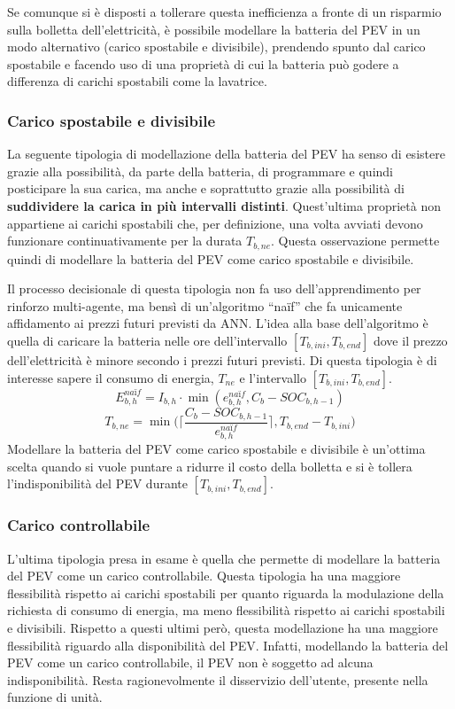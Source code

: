 \documentclass[italian, Lau, oneside]{sapthesis}
\begin{document}
Se comunque si è disposti a tollerare questa inefficienza a fronte di un risparmio sulla bolletta dell'elettricità, è possibile modellare la batteria del PEV in un modo alternativo (carico spostabile e divisibile), prendendo spunto dal carico spostabile e facendo uso di una proprietà di cui la batteria può godere a differenza di carichi spostabili come la lavatrice.

\subsubsection{Carico spostabile e divisibile}
La seguente tipologia di modellazione della batteria del PEV ha senso di esistere grazie alla possibilità, da parte della batteria, di programmare e quindi posticipare la sua carica, ma anche e soprattutto grazie alla possibilità di \textbf{suddividere la carica in più intervalli distinti}. Quest'ultima proprietà non appartiene ai carichi spostabili che, per definizione, una volta avviati devono funzionare continuativamente per la durata $T_{b,ne}$. Questa osservazione permette quindi di modellare la batteria del PEV come carico spostabile e divisibile.

Il processo decisionale di questa tipologia non fa uso dell'apprendimento per rinforzo multi-agente, ma bensì di un'algoritmo “naïf” che fa unicamente affidamento ai prezzi futuri previsti da ANN. L'idea alla base dell'algoritmo è quella di caricare la batteria nelle ore dell'intervallo $[T_{b,ini}, T_{b,end}]$ dove il prezzo dell'elettricità è minore secondo i prezzi futuri previsti. Di questa tipologia è di interesse sapere il consumo di energia, $T_{ne}$ e l'intervallo $[T_{b,ini}, T_{b,end}]$.
\begin{equation}
E^{naïf}_{b,h} = I_{b,h} \cdot \min(e^{naïf}_{b,h}, C_b - SOC_{b,h-1})
\end{equation}
\begin{equation}
    T_{b,ne} = \min \Bigg( \Bigg \lceil \frac{C_b - SOC_{b,h-1}}{e^{naïf}_{b,h}} \Bigg \rceil, T_{b,end}-T_{b,ini} \Bigg)
\end{equation}
Modellare la batteria del PEV come carico spostabile e divisibile è un'ottima scelta quando si vuole puntare a ridurre il costo della bolletta e si è tollera l'indisponibilità del PEV durante $[T_{b,ini}, T_{b,end}]$.

\subsubsection{Carico controllabile}
L'ultima tipologia presa in esame è quella che permette di modellare la batteria del PEV come un carico controllabile. Questa tipologia ha una maggiore flessibilità rispetto ai carichi spostabili per quanto riguarda la modulazione della richiesta di consumo di energia, ma meno flessibilità rispetto ai carichi spostabili e divisibili. Rispetto a questi ultimi però, questa modellazione ha una maggiore flessibilità riguardo alla disponibilità del PEV. Infatti, modellando la batteria del PEV come un carico controllabile, il PEV non è soggetto ad alcuna indisponibilità. Resta ragionevolmente il disservizio dell'utente, presente nella funzione di unità.
\end{document}
